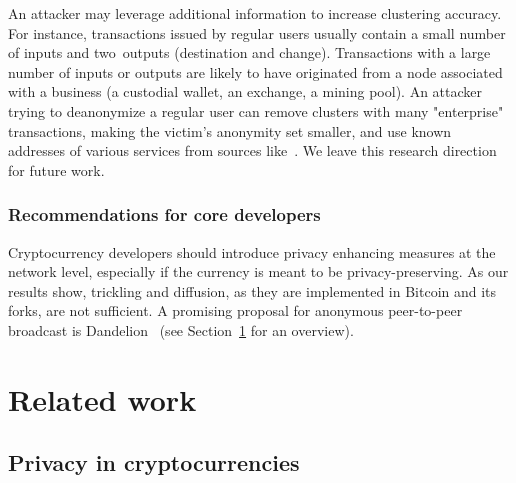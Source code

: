 An attacker may leverage additional information to increase clustering accuracy.
For instance, transactions issued by regular users usually contain a small number of inputs and two~outputs (destination and change).
Transactions with a large number of inputs or outputs are likely to have originated from a node associated with a business (a custodial wallet, an exchange, a mining pool).
An attacker trying to deanonymize a regular user can remove clusters with many "enterprise" transactions, making the victim's anonymity set smaller, and use known addresses of various services from sources like~\cite{Walletexplorer}.
We leave this research direction for future work.


\subsubsection{Recommendations for core developers}

Cryptocurrency developers should introduce privacy enhancing measures at the network level, especially if the currency is meant to be privacy-preserving.
As our results show, trickling and diffusion, as they are implemented in Bitcoin and its forks, are not sufficient.
A promising proposal for anonymous peer-to-peer broadcast is Dandelion~\cite{Venkatakrishnan2017, Fanti2018} (see Section~\ref{sec:Ch03_Related_work} for an overview).


\section{Related work}  \label{sec:Ch03_Related_work}

\subsection{Privacy in cryptocurrencies}

